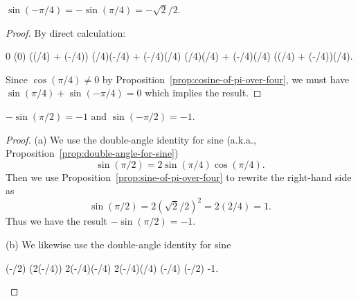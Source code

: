 \begin{proposition}\label{prop:sine-of-minus-pi-over-four}
$\sin(-\pi/4) = -\sin(\pi/4) = -\sqrt{2}/2$.
\end{proposition}
\begin{proof}
By direct calculation:
\begin{calculation}
0
\sin(0)
\sin\bigl((\pi/4) + (-\pi/4)\bigr)
\sin(\pi/4)\cos(-\pi/4) + \sin(-\pi/4)\cos(\pi/4)
\sin(\pi/4)\cos(\pi/4) + \sin(-\pi/4)\cos(\pi/4)
\bigl(\sin(\pi/4) + \sin(-\pi/4)\bigr)\cos(\pi/4).
\end{calculation}
Since $\cos(\pi/4)\neq0$ by Proposition~\ref{prop:cosine-of-pi-over-four}, we must have $\sin(\pi/4) + \sin(-\pi/4)=0$
which implies the result.
\end{proof}

\begin{proposition}\label{prop:sine-half-pi-is-minus-one}
$-\sin(\pi/2)=-1$ and $\sin(-\pi/2)=-1$.
\end{proposition}
\begin{proof}
(a) We use the double-angle identity for
sine (a.k.a., Proposition~\ref{prop:double-angle-for-sine})
\begin{equation}
\sin(\pi/2) = 2\sin(\pi/4)\cos(\pi/4).
\end{equation}
Then we use Proposition~\ref{prop:sine-of-pi-over-four} to rewrite the
right-hand side as
\begin{equation}
\sin(\pi/2) = 2(\sqrt{2}/2)^{2} = 2(2/4) = 1.
\end{equation}
Thus we have the result $-\sin(\pi/2)=-1$.

(b) We likewise use the double-angle identity for sine
\begin{calculation}
\sin(-\pi/2)
\sin\bigl(2(-\pi/4)\bigr)
2\sin(-\pi/4)\cos(-\pi/4)
2\sin(-\pi/4)\cos(\pi/4)
\sin(-\pi/4)
(-/2)
-1.\qedhere
\end{calculation}
\end{proof}

